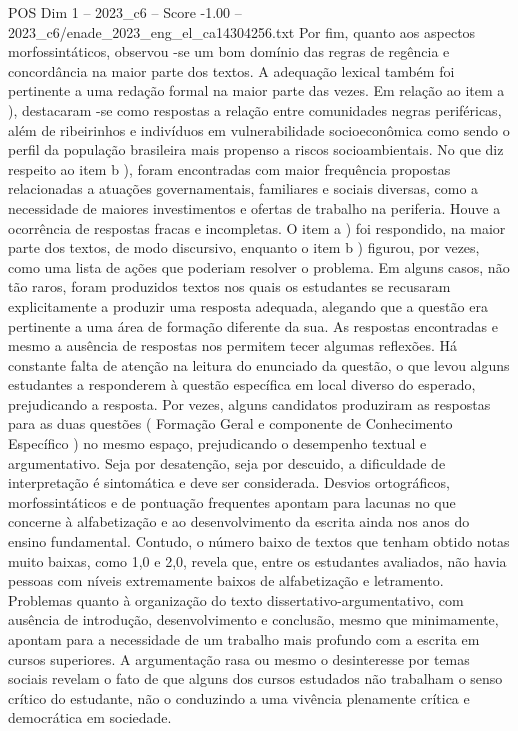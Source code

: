 \begin{textsample}{POS Dim 1 – 2023\_c6 – Score -1.00 – 2023\_c6/enade\_2023\_eng\_el\_ca14304256.txt}
Por fim, quanto aos aspectos morfossintáticos, observou -se um bom domínio das regras de regência e concordância na maior parte dos textos.
A adequação lexical também foi pertinente a uma redação formal na maior parte das vezes.
Em relação ao item a ), destacaram -se como respostas a relação entre comunidades negras periféricas, além de ribeirinhos e indivíduos em vulnerabilidade socioeconômica como sendo o perfil da população brasileira mais propenso a riscos socioambientais.
No que diz respeito ao item b ), foram encontradas com maior frequência propostas relacionadas a atuações governamentais, familiares e sociais diversas, como a necessidade de maiores investimentos e ofertas de trabalho na periferia.
Houve a ocorrência de respostas fracas e incompletas.
O item a ) foi respondido, na maior parte dos textos, de modo discursivo, enquanto o item b ) figurou, por vezes, como uma lista de ações que poderiam resolver o problema.
Em alguns casos, não tão raros, foram produzidos textos nos quais os estudantes se recusaram explicitamente a produzir uma resposta adequada, alegando que a questão era pertinente a uma área de formação diferente da sua.
As respostas encontradas e mesmo a ausência de respostas nos permitem tecer algumas reflexões.
Há constante falta de atenção na leitura do enunciado da questão, o que levou alguns estudantes a responderem à questão específica em local diverso do esperado, prejudicando a resposta.
Por vezes, alguns candidatos produziram as respostas para as duas questões ( Formação Geral e componente de Conhecimento Específico ) no mesmo espaço, prejudicando o desempenho textual e argumentativo.
Seja por desatenção, seja por descuido, a dificuldade de interpretação é sintomática e deve ser considerada.
Desvios ortográficos, morfossintáticos e de pontuação frequentes apontam para lacunas no que concerne à alfabetização e ao desenvolvimento da escrita ainda nos anos do ensino fundamental.
Contudo, o número baixo de textos que tenham obtido notas muito baixas, como 1,0 e 2,0, revela que, entre os estudantes avaliados, não havia pessoas com níveis extremamente baixos de alfabetização e letramento.
Problemas quanto à organização do texto dissertativo-argumentativo, com ausência de introdução, desenvolvimento e conclusão, mesmo que minimamente, apontam para a necessidade de um trabalho mais profundo com a escrita em cursos superiores.
A argumentação rasa ou mesmo o desinteresse por temas sociais revelam o fato de que alguns dos cursos estudados não trabalham o senso crítico do estudante, não o conduzindo a uma vivência plenamente crítica e democrática em sociedade.

\end{textsample}
